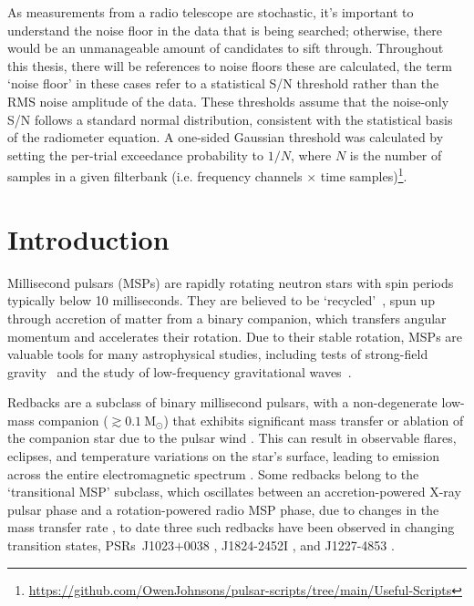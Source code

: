 As measurements from a radio telescope are stochastic, it's important to understand the noise floor in the data that is being searched; otherwise, there would be an unmanageable amount of candidates to sift through. Throughout this thesis, there will be references to noise floors these are calculated, the term ‘noise floor’ in these cases refer to a statistical S/N threshold rather than the RMS noise amplitude of the data. These thresholds assume that the noise-only S/N follows a standard normal distribution, consistent with the statistical basis of the radiometer equation. A one-sided Gaussian threshold was calculated by setting the per-trial exceedance probability to $1/N$, where $N$ is the number of samples in a given filterbank (i.e. frequency channels $\times$ time samples)\footnote{\url{https://github.com/OwenJohnsons/pulsar-scripts/tree/main/Useful-Scripts}}. 

\newpage 
\section{Introduction}
Millisecond pulsars (MSPs) are rapidly rotating neutron stars with spin periods typically below 10 milliseconds. They are believed to be `recycled'~\citep{bh91}, spun up through accretion of matter from a binary companion, which transfers angular momentum and accelerates their rotation. Due to their stable rotation, MSPs are valuable tools for many astrophysical studies, including tests of strong-field gravity~\citep{kramer2021} and the study of low-frequency gravitational waves~\cite{fb90}.

Redbacks are a subclass of binary millisecond pulsars, with a non-degenerate low-mass companion ($\gtrsim 0.1~ \text{M}_\odot$) that exhibits significant mass transfer or ablation of the companion star due to the pulsar wind \citep{roberts_x-ray_2017}. This can result in observable flares, eclipses, and temperature variations on the star’s surface, leading to emission across the entire electromagnetic spectrum \citep{papitto_transitional_2022,kirichenko_black_2024}. Some redbacks belong to the ‘transitional MSP’ subclass, which oscillates between an accretion-powered X-ray pulsar phase and a rotation-powered radio MSP phase, due to changes in the mass transfer rate \citep{Papitto2013, papitto_transitional_2022}, to date three such redbacks have been observed in changing transition states, PSRs~J1023$+$0038 \citep{Stappers2014}, J1824-2452I \citep{Papitto2013}, and J1227-4853 \citep{Roy2015}. 

